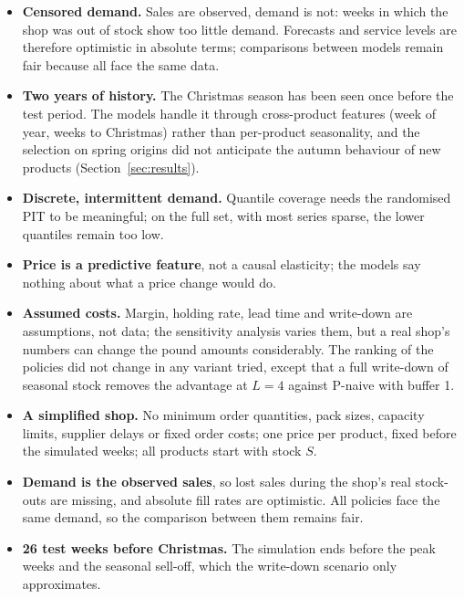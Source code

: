 \documentclass[11pt,a4paper]{article}
\begin{document}
\begin{itemize}
  \item \textbf{Censored demand.} Sales are observed, demand is not: weeks in which the shop was
    out of stock show too little demand. Forecasts and service levels are therefore optimistic
    in absolute terms; comparisons between models remain fair because all face the same data.
  \item \textbf{Two years of history.} The Christmas season has been seen once before the test
    period. The models handle it through cross-product features (week of year, weeks to
    Christmas) rather than per-product seasonality, and the selection on spring origins did
    not anticipate the autumn behaviour of new products (Section~\ref{sec:results}).
  \item \textbf{Discrete, intermittent demand.} Quantile coverage needs the randomised PIT to be
    meaningful; on the full set, with most series sparse, the lower quantiles remain too low.
  \item \textbf{Price is a predictive feature}, not a causal elasticity; the models say nothing
    about what a price change would do.
\end{itemize}

\begin{itemize}
  \item \textbf{Assumed costs.} Margin, holding rate, lead time and write-down are assumptions,
    not data; the sensitivity analysis varies them, but a real shop's numbers can change the
    pound amounts considerably. The ranking of the policies did not change in any
    variant tried, except that a full write-down of seasonal stock removes the advantage at
    $L = 4$ against P-naive with buffer 1.
  \item \textbf{A simplified shop.} No minimum order quantities, pack sizes, capacity limits,
    supplier delays or fixed order costs; one price per product, fixed before the simulated
    weeks; all products start with stock $S$.
  \item \textbf{Demand is the observed sales}, so lost sales during the shop's real stock-outs
    are missing, and absolute fill rates are optimistic. All policies face the same demand, so
    the comparison between them remains fair.
  \item \textbf{26 test weeks before Christmas.} The simulation ends before the peak weeks
    and the seasonal sell-off, which the write-down scenario only approximates.
\end{itemize}
\end{document}
